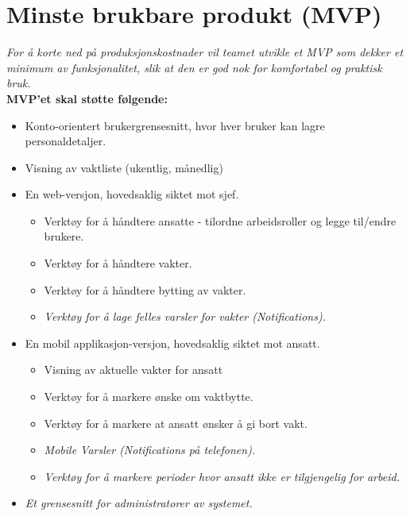 \chapter{Minste brukbare produkt (MVP)}
\textit{For å korte ned på produksjonskostnader vil teamet utvikle et MVP som dekker et minimum av funksjonalitet, slik at den er god nok for komfortabel og praktisk bruk.}\\[1cm]
\textbf{MVP'et skal støtte følgende:}
\begin{itemize}
	\item Konto-orientert brukergrensesnitt, hvor hver bruker kan lagre personaldetaljer.
	\item Visning av vaktliste (ukentlig, månedlig)
	\item En web-versjon, hovedsaklig siktet mot sjef.
	\begin{itemize}
		\item Verktøy for å håndtere ansatte - tilordne arbeidsroller og legge til/endre brukere.
		\item Verktøy for å håndtere vakter.
		\item Verktøy for å håndtere bytting av vakter.
		\item \textit{Verktøy for å lage felles varsler for vakter (Notifications).}
	\end{itemize}
	\item En mobil applikasjon-versjon, hovedsaklig siktet mot ansatt.
	\begin{itemize}
		\item Visning av aktuelle vakter for ansatt
		\item Verktøy for å markere ønske om vaktbytte.
		\item Verktøy for å markere at ansatt ønsker å gi bort vakt.
		\item \textit{Mobile Varsler (Notifications på telefonen).}
		\item \textit{Verktøy for å markere perioder hvor ansatt ikke er tilgjengelig for arbeid.}
	\end{itemize}
	\item \textit{Et grensesnitt for administratorer av systemet.}
\end{itemize}